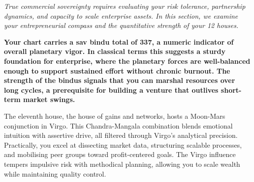 


{\fontsize{9.5}{14}\selectfont\color{DeepSlate}\itshape True commercial sovereignty requires evaluating your risk tolerance, partnership dynamics, and capacity to scale enterprise assets. In this section, we examine your entrepreneurial compass and the quantitative strength of your 12 houses.}\par\vspace{3.5mm}

\label{topic49}

{\fontsize{9.5}{13.8}\selectfont\bfseries\color{DeepSlate} Your chart carries a sav bindu total of 337, a numeric indicator of overall planetary vigor. In classical terms this suggests a sturdy foundation for enterprise, where the planetary forces are well-balanced enough to support sustained effort without chronic burnout. The strength of the bindus signals that you can marshal resources over long cycles, a prerequisite for building a venture that outlives short-term market swings.}\par\vspace{2mm}

{\fontsize{9}{13}\selectfont The eleventh house, the house of gains and networks, hosts a Moon-Mars conjunction in Virgo. This Chandra-Mangala combination blends emotional intuition with assertive drive, all filtered through Virgo's analytical precision. Practically, you excel at dissecting market data, structuring scalable processes, and mobilising peer groups toward profit-centered goals. The Virgo influence tempers impulsive risk with methodical planning, allowing you to scale wealth while maintaining quality control.}\par\vspace{1.8mm}

